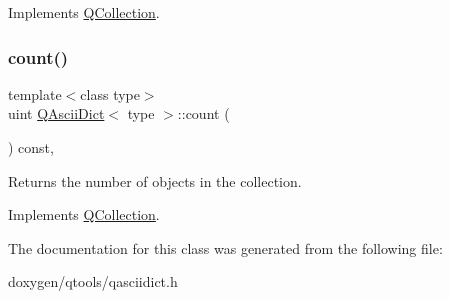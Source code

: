 Implements \mbox{\hyperlink{class_q_collection_a92416cc22907550389aad04c26be2f77}{Q\+Collection}}.

\mbox{\label{class_q_ascii_dict_a2241b13419dc0fcb6da3bcd159219404}} 
\subsubsection{\texorpdfstring{count()}{count()}}
{\footnotesize\ttfamily template$<$class type$>$ \\
uint \mbox{\hyperlink{class_q_ascii_dict}{Q\+Ascii\+Dict}}$<$ type $>$\+::count (\begin{DoxyParamCaption}{ }\end{DoxyParamCaption}) const\hspace{0.3cm}{\ttfamily [inline]}, {\ttfamily [virtual]}}

Returns the number of objects in the collection. 

Implements \mbox{\hyperlink{class_q_collection_a6441adbfb3ffb6f55ed834c0c0bcc6cb}{Q\+Collection}}.



The documentation for this class was generated from the following file\+:\begin{DoxyCompactItemize}
\item 
doxygen/qtools/qasciidict.\+h\end{DoxyCompactItemize}
